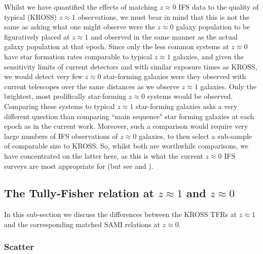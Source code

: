 \documentclass[a4paper,fleqn,usenatbib]{mnras}
\begin{document}
{Whilst we have quantified the effects of matching $z\approx0$ IFS data to the quality of typical (KROSS) $z\approx1$ observations, we must bear in mind that this is not the same as asking what one might observe were the $z\approx0$ galaxy population to be figuratively placed at $z\approx1$ and observed in the same manner as the actual galaxy population at that epoch. Since only the less common systems at $z \approx 0$ have star formation rates comparable to typical $z\approx1$ galaxies, and given the sensitivity limits of current detectors and with similar exposure times as KROSS, we would detect very few $z\approx0$ star-forming galaxies were they observed with current telescopes over the same distances as we observe $z\approx1$ galaxies. Only the brightest, most prolifically star-forming $z\approx0$ systems would be observed. Comparing these systems to typical $z\approx1$ star-forming galaxies asks a very different question than comparing ``main sequence" star forming galaxies at each epoch as in the current work. Moreover, such a comparison would require very large numbers of IFS observations of $z\approx0$ galaxies, to then select a sub-sample of comparable size to KROSS. So, whilst both are worthwhile comparisons, we have concentrated on the latter here, as this is what the current $z\approx0$ IFS surveys are most appropriate for (but see \citealt{Green:2014} and \citealt{Fisher:2016}).  

\subsection{The Tully-Fisher relation at $z\mathbf{\approx}1$ and $z\mathbf{\approx}0$}

In this sub-section we discuss the differences between the KROSS TFRs at $z\approx1$ and the corresponding matched SAMI relations at $z\approx0$.

\subsubsection{Scatter}
\label{subsubsec:scatterdiscussion}

}
\end{document}
